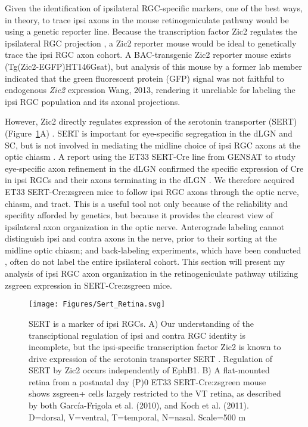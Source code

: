 Given the identification of ipsilateral RGC-specific markers, one of the best ways, in theory, to trace ipsi axons in the mouse retinogeniculate pathway would be using a genetic reporter line.
Because the transcription factor Zic2 regulates the ipsilateral RGC projection \cite{herrera2003zic2,williams2003ephrin}, a Zic2 reporter mouse would be ideal to genetically trace the ipsi RGC axon cohort.
A BAC-transgenic Zic2 reporter mouse exists (Tg(Zic2-EGFP)HT146Gsat), but analysis of this mouse by a former lab member indicated that the green fluorescent protein (GFP) signal was not faithful to endogenous \emph{Zic2} expression {Wang, 2013}, rendering it unreliable for labeling the ipsi RGC population and its axonal projections.

However, Zic2 directly regulates expression of the serotonin transporter (SERT) (Figure~\ref{Figures/Sert_Retina}A) \cite{garcia2010zic2}.
SERT is important for eye-specific segregation in the dLGN and SC, but is not involved in mediating the midline choice of ipsi RGC axons at the optic chiasm \cite{salichon2001excessive,upton1999excess,garcia2010zic2}.
A report using the ET33 SERT-Cre line from GENSAT to study eye-specific axon refinement in the dLGN confirmed the specific expression of Cre in ipsi RGCs and their axons terminating in the dLGN \cite{koch2011pathway}.
We therefore acquired ET33 SERT-Cre:zsgreen mice to follow ipsi RGC axons through the optic nerve, chiasm, and tract.
This is a useful tool not only because of the reliability and specifity afforded by genetics, but because it provides the clearest view of ipsilateral axon organization in the optic nerve.
Anterograde labeling cannot distinguish ipsi and contra axons in the nerve, prior to their sorting at the midline optic chiasm; and back-labeling experiments, which have been conducted \cite{colello1990early}, often do not label the entire ipsilateral cohort.
This section will present my analysis of ipsi RGC axon organization in the retinogeniculate pathway utilizing zsgreen expression in SERT-Cre:zsgreen mice.

\begin{figure}[hbtp]
	\begin{center}
		\texttt{[image: Figures/Sert\_Retina.svg]}
		\caption[SERT is a marker of ipsi RGCs.]
		{SERT is a marker of ipsi RGCs. 
		A) Our understanding of the transciptional regulation of ipsi and contra RGC identity is incomplete, but the ipsi-specific transcription factor Zic2 is known to drive expression of the serotonin transporter SERT \cite{garcia2010zic2}.
		Regulation of SERT by Zic2 occurs independently of EphB1.
		B) A flat-mounted retina from a postnatal day (P)0 ET33 SERT-Cre:zsgreen mouse shows zsgreen+ cells largely restricted to the VT retina, as described by both Garc\'ia-Frigola et al. (2010), and Koch et al. (2011). 
		D=dorsal, V=ventral, T=temporal, N=nasal. 
		Scale=500 \mu m}
		\label{Figures/Sert_Retina}
	\end{center}
\end{figure}

